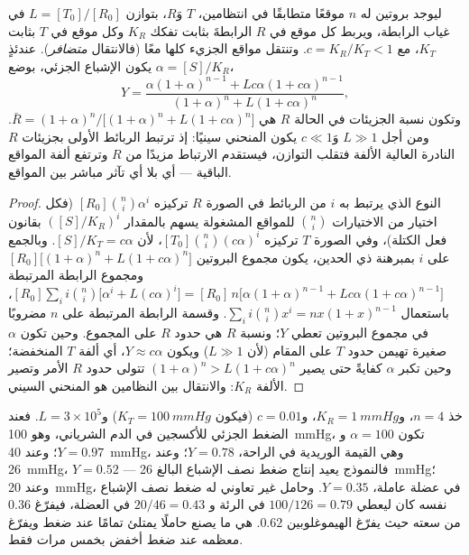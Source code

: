 \begin{theorem}\label{thm:b3:structural-biology:mwc}
ليوجد بروتين له $n$ موقعًا متطابقًا في انتظامين،
$T$ وَ$R$، بتوازن $L = [T_{0}]/[R_{0}]$ في غياب
الرابطة، ويربط كل موقع في $R$ الرابطةَ بثابت تفكك
$K_{R}$ وكل موقع في $T$ بثابت $K_{T}$، مع $c = K_{R}/K_{T} < 1$. وتنتقل
مواقع الجزيء كلها معًا (فالانتقال
\emph{متضافر}). عندئذٍ يكون الإشباع الجزئي، بوضع $\alpha = [S]/K_{R}$،
\[
Y = \frac{\alpha(1+\alpha)^{n-1} + Lc\alpha(1+c\alpha)^{n-1}}
{(1+\alpha)^{n} + L(1+c\alpha)^{n}},
\]
وتكون نسبة الجزيئات في الحالة $R$ هي $\bar R =
(1+\alpha)^{n}/\bigl[(1+\alpha)^{n} + L(1+c\alpha)^{n}\bigr]$. ومن أجل $L
\gg 1$ وَ$c \ll 1$ يكون المنحني سينيًا: إذ ترتبط الربائط الأولى بجزيئات
$R$ النادرة العالية الألفة فتقلب التوازن، فيستقدم
الارتباط مزيدًا من $R$ وترتفع ألفة المواقع الباقية
--- أي  بلا أي تآثر مباشر بين المواقع.
\end{theorem}
\begin{proof}
النوع الذي يرتبط به $i$ من الربائط في الصورة $R$ تركيزه
$[R_{0}]\binom{n}{i}\alpha^{i}$ (فكل اختيار من الاختيارات $\binom{n}{i}$
للمواقع المشغولة يسهم بالمقدار $([S]/K_{R})^{i}$ بقانون فعل
الكتلة)، وفي الصورة $T$ تركيزه $[T_{0}]\binom{n}{i}(c\alpha)^{i}$، لأن
$[S]/K_{T} = c\alpha$. وبالجمع على $i$ بمبرهنة ذي الحدين، يكون
مجموع البروتين $[R_{0}]\bigl[(1+\alpha)^{n} + L(1+c\alpha)^{n}\bigr]$
ومجموع الرابطة المرتبطة $[R_{0}]\sum_{i} i\binom{n}{i}\bigl[
\alpha^{i} + L(c\alpha)^{i}\bigr] = [R_{0}]\,n\bigl[\alpha(1+\alpha)^{n-1}
+ Lc\alpha(1+c\alpha)^{n-1}\bigr]$، باستعمال $\sum_{i} i\binom{n}{i}x^{i} =
nx(1+x)^{n-1}$. وقسمة الرابطة المرتبطة على $n$ مضروبًا في مجموع البروتين تعطي
$Y$؛ ونسبة $R$ هي حدود $R$ على المجموع. وحين تكون $\alpha$
صغيرة تهيمن حدود $T$ على المقام (لأن $L \gg 1$) ويكون
$Y \approx c\alpha$، أي ألفة $T$ المنخفضة؛ وحين تكبر $\alpha$ كفايةً
حتى يصير $(1+\alpha)^{n} > L(1+c\alpha)^{n}$ تتولى حدود $R$ الأمر وتصير
الألفة $K_{R}$: والانتقال بين النظامين هو المنحني السيني.
\end{proof}

\begin{example}\label{ex:b3:structural-biology:hb-numbers}
خذ $n = 4$، و$K_{R} = \qty{1}{mmHg}$، و$c = 0.01$ (فيكون $K_{T} =
\qty{100}{mmHg}$) و$L = 3\times 10^{5}$. فعند الضغط الجزئي
للأكسجين في الدم الشرياني، وهو \qty{100}{mmHg}، تكون $\alpha = 100$ و$Y =
0.97$؛ وعند \qty{40}{mmHg}، وهي القيمة الوريدية في الراحة، $Y = 0.78$؛ وعند
\qty{26}{mmHg}، $Y = 0.52$ --- فالنموذج يعيد إنتاج ضغط
نصف الإشباع البالغ \qty{26}{mmHg}؛ وعند \qty{20}{mmHg}، في عضلة
عاملة، $Y = 0.35$. وحامل غير تعاوني له ضغط نصف الإشباع
نفسه كان ليعطي $100/126 = 0.79$ في الرئة و
$20/46 = 0.43$ في العضلة، فيفرّغ $0.36$ من سعته حيث
يفرّغ الهيموغلوبين $0.62$.  هي ما يصنع حاملًا
يمتلئ تمامًا عند ضغط ويفرّغ معظمه عند ضغط أخفض بخمس مرات فقط.
\end{example}

